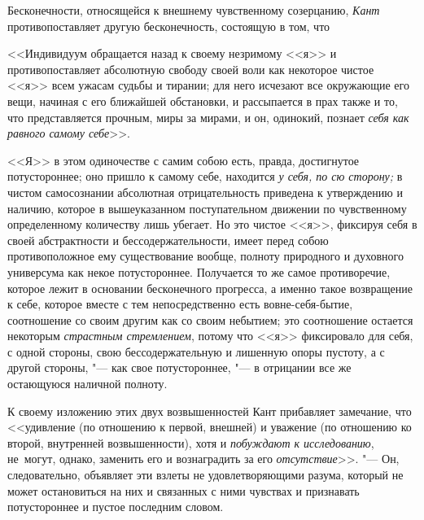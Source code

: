 Бесконечности, относящейся к внешнему чувственному созерцанию, {\em Кант}
противопоставляет другую бесконечность, состоящую в том, что

<<Индивидуум обращается назад к своему незримому <<я>> и противопоставляет
абсолютную свободу своей воли как некоторое чистое <<я>> всем ужасам судьбы
и тирании; для него исчезают все окружающие его вещи, начиная с его ближайшей
обстановки, и рассыпается в прах также и то, что представляется прочным, миры
за мирами, и он, одинокий, познает {\em себя как равного самому себе}>>.

<<Я>> в этом одиночестве с самим собою есть, правда, достигнутое потустороннее;
оно пришло к самому себе, находится {\em у себя, по сю сторону;} в чистом
самосознании абсолютная отрицательность приведена к утверждению и наличию,
которое в вышеуказанном поступательном движении по чувственному определенному
количеству лишь убегает. Но это чистое <<я>>, фиксируя себя в своей
абстрактности и бессодержательности, имеет перед собою противоположное ему
существование вообще, полноту природного и духовного универсума как некое
потустороннее. Получается то же самое противоречие, которое лежит в основании
бесконечного прогресса, а именно такое возвращение к себе, которое вместе с тем
непосредственно есть вовне-себя-бытие, соотношение со своим другим как со своим
небытием; это соотношение остается некоторым {\em страстным стремлением},
потому что <<я>> фиксировало для себя, с одной стороны, свою бессодержательную
и лишенную опоры пустоту, а с другой стороны, "--- как свое потустороннее, "---
в отрицании все же остающуюся наличной полноту.

К своему изложению этих двух возвышенностей Кант прибавляет замечание, что
<<удивление (по отношению к первой, внешней) и уважение (по отношению ко
второй, внутренней возвышенности), хотя и {\em побуждают к исследованию},
не~могут, однако, заменить его и вознаградить за его
{\em отсутствие}>>. "--- Он, следовательно, объявляет эти взлеты не удовлетворяющими
разума, который не может остановиться на них и связанных с ними чувствах и
признавать потустороннее и пустое последним словом.

